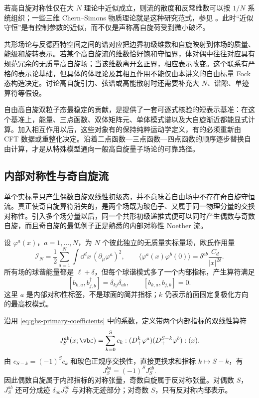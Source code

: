 若高自旋对称性仅在大 $N$ 理论中近似成立，则流的散度和反常维数可以按 $1/N$ 系统组织；一些三维 Chern--Simons 物质理论就是这种研究范式，参见 \cite{ghs-maldacena-zh-broken}。此时“近似守恒”是有控制参数的近似，而不仅是声称高自旋荷受到微小破坏。


共形场论与反德西特空间之间的谱对应把边界初级维数和自旋映射到体场的质量、能级和旋转表示。若某个高自旋流的维数恰好饱和守恒界，体对偶中往往对应具有规范冗余的无质量高自旋场；当该维数离开幺正界，相应表示改变。这个联系有严格的表示论基础，但具体的体理论及其相互作用不能仅由本讲义的自由标量 Fock 态构造决定。讨论高自旋引力、弦谱或高能散射时还需要补充大 $N$、谱隙、单迹算符等假设。

自由高自旋双粒子态最稳定的贡献，是提供了一套可逐式核验的短表示基准：在这个基准上，能量、三点函数、双体矩阵元、单体模式谱以及大自旋渐近都能显式计算。加入相互作用以后，这些对象有的保持纯粹运动学定义，有的必须重新由 CFT 数据或重整化决定。沿着二点函数—三点函数—四点函数的顺序逐步替换自由计算，才是从特殊模型通向一般高自旋量子场论的可靠路径。


\subsection{内部对称性与奇自旋流}

单个实标量只产生偶数自旋双线性初级态，并不意味着自由场中不存在奇自旋守恒流。真正使奇自旋算符消失的，是两个场既为玻色子、又属于同一物理分量的交换对称性。引入多个场分量以后，同一个共形初级递推式便可以同时产生偶数与奇数自旋，而且奇自旋的最低例子正是熟悉的内部对称性 Noether 流。


设 $\varphi^a(x)$，$a=1,\ldots,N$，为 $N$ 个彼此独立的无质量实标量场，欧氏作用量
\begin{equation}\label{eq:ghs-flavor-free-action}
 \mathscr I_N=\frac12\sum_{a=1}^N\int\dd^d x\,(\partial_\mu\varphi^a)^2,
 \qquad\langle\varphi^a(x)\varphi^b(0)\rangle
 =\delta^{ab}\frac{C_d}{|x|^{2\delta}}.
\end{equation}
所有场的球谐能量都是 $\ell+\delta$，但每个球谐模式多了一个内部指标，产生算符满足
\begin{equation}\label{eq:ghs-flavor-fock-commutator}
 [b_{k,a},b_{j,b}^\dagger]=\delta_{kj}\delta_{ab},
 \qquad[b_{k,a},b_{j,b}]=0.
\end{equation}
这里 $a$ 是内部对称性标签，不是球面的简并指标；$k$ 仍表示前面固定复极化方向的最高权模式。


沿用 \cref{eq:ghs-primary-coefficients} 中的系数，定义带两个内部指标的双线性算符
\begin{equation}\label{eq:ghs-flavor-high-spin-bilinear}
 J_S^{ab}(x;\vb\varepsilon)=
 \sum_{k=0}^S c_k:
 (D_+^k\varphi^a)(D_+^{S-k}\varphi^b):(x).
\end{equation}
由 $c_{S-k}=(-1)^S c_k$ 和玻色正规序交换性，直接更换求和指标 $k\mapsto S-k$，有
\begin{equation}\label{eq:ghs-flavor-exchange-parity}
 J_S^{ba}=(-1)^S J_S^{ab}.
\end{equation}
因此偶数自旋属于内部指标的对称张量，奇数自旋属于反对称张量。对偶数 $S$，$J_S^{ab}$ 还可分成迹 $\delta_{ab}J_S^{ab}$ 与对称无迹部分；对奇数 $S$，只有反对称内部表示。

